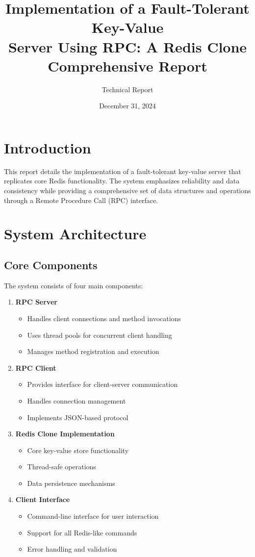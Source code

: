 \documentclass[11pt]{article}
\title{Implementation of a Fault-Tolerant Key-Value\\Server Using RPC: A Redis Clone\\Comprehensive Report}
\author{Technical Report}
\date{December 31, 2024}
\begin{document}
\maketitle

\section{Introduction}
This report details the implementation of a fault-tolerant key-value server that replicates core Redis functionality. The system emphasizes reliability and data consistency while providing a comprehensive set of data structures and operations through a Remote Procedure Call (RPC) interface.

\section{System Architecture}

\subsection{Core Components}
The system consists of four main components:

\begin{enumerate}
    \item \textbf{RPC Server}
    \begin{itemize}
        \item Handles client connections and method invocations
        \item Uses thread pools for concurrent client handling
        \item Manages method registration and execution
    \end{itemize}

    \item \textbf{RPC Client}
    \begin{itemize}
        \item Provides interface for client-server communication
        \item Handles connection management
        \item Implements JSON-based protocol
    \end{itemize}

    \item \textbf{Redis Clone Implementation}
    \begin{itemize}
        \item Core key-value store functionality
        \item Thread-safe operations
        \item Data persistence mechanisms
    \end{itemize}

    \item \textbf{Client Interface}
    \begin{itemize}
        \item Command-line interface for user interaction
        \item Support for all Redis-like commands
        \item Error handling and validation
    \end{itemize}
\end{enumerate}
\end{document}
